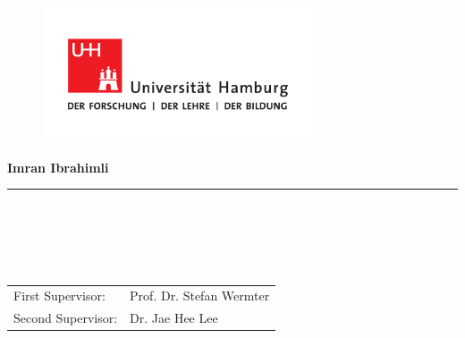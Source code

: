 \begin{titlepage}

  \setcounter{page}{-1}

	\begin{figure}[h]
		\begin{minipage}[b]{62mm}
			\includegraphics[width=80mm]{layout/UHH/up-uhh-logo-u-2010-u-farbe-u-cmyk-modus.pdf}
		\end{minipage}
		\hspace{4cm}
	\end{figure}

	\vfill
	
	\begin{center}
		\vspace{14mm}
        {\makeatletter
		\noindent \textbf{\huge\@title}
        \makeatother}
		\vspace{60mm}	
	\end{center}
	
	\vfill
	
	\noindent \textbf{Imran Ibrahimli} \\
	\noindent \rule{\textwidth}{0.4mm} 
 
	 \\
	 \\
	 \\
     \\
    

\noindent\begin{tabular}{@{}ll}
First Supervisor: & Prof. Dr. Stefan Wermter \\
Second Supervisor: & Dr. Jae Hee Lee \\
\end{tabular}




\end{titlepage}
